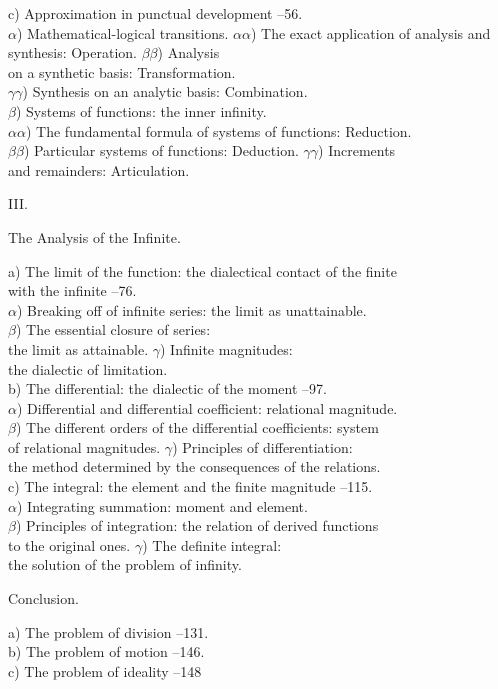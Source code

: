 \documentclass[12pt,a4paper,openany]{book}
\begin{document}
{c) Approximation in punctual development --56.\\
$\alpha$) Mathematical-logical transitions. $\alpha\alpha$) The exact application of analysis and\\
synthesis: Operation. $\beta\beta$) Analysis\\
on a synthetic basis: Transformation.\\
$\gamma\gamma$) Synthesis on an analytic basis: Combination.\\
$\beta$) Systems of functions: the inner infinity.\\
$\alpha\alpha$) The fundamental formula of systems of functions: Reduction.\\
$\beta\beta$) Particular systems of functions: Deduction. $\gamma\gamma$) Increments\\
and remainders: Articulation.
\par\medskip\centerline{III.}\par\noindent
\par\medskip\centerline{The Analysis of the Infinite.}\par\noindent
a) The limit of the function: the dialectical contact of the finite\\
with the infinite --76.\\
$\alpha$) Breaking off of infinite series: the limit as unattainable.\\
$\beta$) The essential closure of series:\\
the limit as attainable. $\gamma$) Infinite magnitudes:\\
the dialectic of limitation.\\
b) The differential: the dialectic of the moment --97.\\
$\alpha$) Differential and differential coefficient: relational magnitude.\\
$\beta$) The different orders of the differential coefficients: system\\
of relational magnitudes. $\gamma$) Principles of differentiation:\\
the method determined by the consequences of the relations.\\
c) The integral: the element and the finite magnitude --115.\\
$\alpha$) Integrating summation: moment and element.\\
$\beta$) Principles of integration: the relation of derived functions\\
to the original ones. $\gamma$) The definite integral:\\
the solution of the problem of infinity.
\par\medskip\centerline{Conclusion.}\par\noindent
a) The problem of division --131.\\
b) The problem of motion --146.\\
c) The problem of ideality --148\\
}
\end{document}
